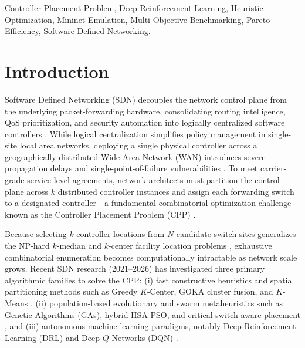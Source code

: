 \documentclass[conference]{IEEEtran}
\begin{document}
\begin{IEEEkeywords}
Controller Placement Problem, Deep Reinforcement Learning, Heuristic Optimization, Mininet Emulation, Multi-Objective Benchmarking, Pareto Efficiency, Software Defined Networking.
\end{IEEEkeywords}

\section{Introduction}
Software Defined Networking (SDN) decouples the network control plane from the underlying packet-forwarding hardware, consolidating routing intelligence, QoS prioritization, and security automation into logically centralized software controllers \cite{ali2025, alqaruty2025, boudi2026}. While logical centralization simplifies policy management in single-site local area networks, deploying a single physical controller across a geographically distributed Wide Area Network (WAN) introduces severe propagation delays and single-point-of-failure vulnerabilities \cite{mohanty2021, jadhav2025}. To meet carrier-grade service-level agreements, network architects must partition the control plane across $k$ distributed controller instances and assign each forwarding switch to a designated controller---a fundamental combinatorial optimization challenge known as the Controller Placement Problem (CPP) \cite{mohanty2021, yusuf2023, vardhan2025}.

Because selecting $k$ controller locations from $N$ candidate switch sites generalizes the NP-hard $k$-median and $k$-center facility location problems \cite{mohanty2021, xiao2021}, exhaustive combinatorial enumeration becomes computationally intractable as network scale grows. Recent SDN research (2021--2026) has investigated three primary algorithmic families to solve the CPP: (i) fast constructive heuristics and spatial partitioning methods such as Greedy $K$-Center, GOKA cluster fusion, and $K$-Means \cite{mohanty2021, xiao2021, priya2025}, (ii) population-based evolutionary and swarm metaheuristics such as Genetic Algorithms (GAs), hybrid HSA-PSO, and critical-switch-aware placement \cite{yusuf2023, radam2022, xu2023}, and (iii) autonomous machine learning paradigms, notably Deep Reinforcement Learning (DRL) and Deep $Q$-Networks (DQN) \cite{benoudifa2023, hechmi2025, kurra2025, farahi2026}.
\end{document}
